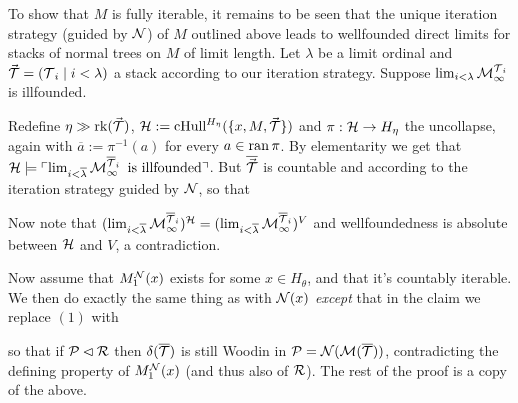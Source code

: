 \documentclass[../../main]{subfiles}
\begin{document}
{  \qquad To show that $M$ is fully iterable, it remains to be seen that the unique iteration strategy (guided by $\operatorname{\mathcal N}$) of $M$ outlined above leads to wellfounded direct limits for stacks of normal trees on $M$ of limit length. Let $\lambda$ be a limit ordinal and $\vec{\operatorname{\mathcal T}} = (\operatorname{\mathcal T}_i \mid i<\lambda)$ a stack according to our iteration strategy. Suppose $\lim_{i<\lambda}\operatorname{\mathcal M}^{\operatorname{\mathcal T}_i}_\infty$ is illfounded.
  
  \qquad Redefine $\eta\gg\operatorname{rk}(\vec{\operatorname{\mathcal T}})$, $\operatorname{\mathcal H}:=\operatorname{cHull}^{H_\eta}(\{x,M,\vec{\operatorname{\mathcal T}}\})$ and $\pi:\operatorname{\mathcal H}\to H_\eta$ the uncollapse, again with $\overline a:=\pi^{-1}(a)$ for every $a\in\operatorname{ran}\pi$. By elementarity we get that $\operatorname{\mathcal H}\models\ulcorner \lim_{i<\overline\lambda}\operatorname{\mathcal M}^{\overline{\operatorname{\mathcal T}}_i}_\infty\text{ is illfounded} \urcorner$. But $\overline{\vec{\operatorname{\mathcal T}}}$ is countable and according to the iteration strategy guided by $\operatorname{\mathcal N}$, so that

  Now note that $(\lim_{i<\overline\lambda}\operatorname{\mathcal M}^{\overline{\operatorname{\mathcal T}}_i}_\infty)^{\operatorname{\mathcal H}}=(\lim_{i<\overline\lambda}\operatorname{\mathcal M}^{\overline{\operatorname{\mathcal T}}_i}_\infty)^V$ and wellfoundedness is absolute between $\operatorname{\mathcal H}$ and $V$, a contradiction.
    
  \qquad Now assume that $M_1^{\operatorname{\mathcal N}}(x)$ exists for some $x\in H_\theta$, and that it's countably iterable. We then do exactly the same thing as with $\operatorname{\mathcal N}(x)$ \textit{except} that in the claim we replace $(1)$ with

  so that if $\mathcal{P}\lhd\operatorname{\mathcal R}$ then $\delta(\overline{\operatorname{\mathcal T}})$ is still Woodin in $\mathcal{P}=\operatorname{\mathcal N}(\operatorname{\mathcal M}(\overline{\operatorname{\mathcal T}}))$, contradicting the defining property of $M_1^{\operatorname{\mathcal N}}(x)$ (and thus also of $\operatorname{\mathcal R}$). The rest of the proof is a copy of the above.
}
\end{document}
